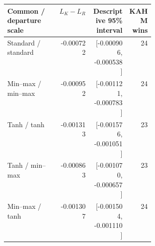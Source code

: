 \begin{tabular}{@{}p{0.35\linewidth}rrr@{}}
\toprule
Common / departure scale & $L_K-L_R$ & Descriptive 95\% interval & KAHM wins \\
\midrule
Standard / standard & -0.000722 & [-0.000906, -0.000538] & 24 \\
Min--max / min--max & -0.000952 & [-0.001121, -0.000783] & 24 \\
Tanh / tanh & -0.001313 & [-0.001576, -0.001051] & 23 \\
Tanh / min--max & -0.000863 & [-0.001070, -0.000657] & 23 \\
Min--max / tanh & -0.001307 & [-0.001504, -0.001110] & 24 \\
\bottomrule
\end{tabular}
